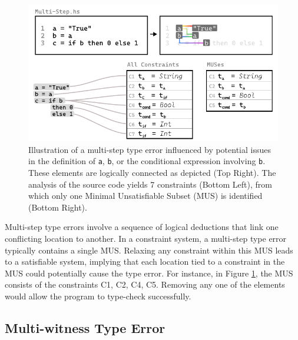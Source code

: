 \begin{figure}[hbt]
  \includegraphics[width=\linewidth]{Multi-Step-MUS}
  \caption{Illustration of a multi-step type error influenced by potential issues in the definition of \texttt{a}, \texttt{b}, or the conditional expression involving \texttt{b}. These elements are logically connected as depicted (Top Right). The analysis of the source code yields 7 constraints (Bottom Left), from which only one Minimal Unsatisfiable Subset (MUS) is identified (Bottom Right).}
  \label{fig:multi-step-2}
  \end{figure}


Multi-step type errors involve a sequence of logical deductions that link one conflicting location to another. In a constraint system, a multi-step type error typically contains a single MUS. Relaxing any constraint within this MUS leads to a satisfiable system, implying that each location tied to a constraint in the MUS could potentially cause the type error. For instance, in Figure \ref{fig:multi-step-2}, the MUS consists of the constraints {C1, C2, C4, C5}. Removing any one of the elements would allow the program to type-check successfully.

\subsection{Multi-witness Type Error}


